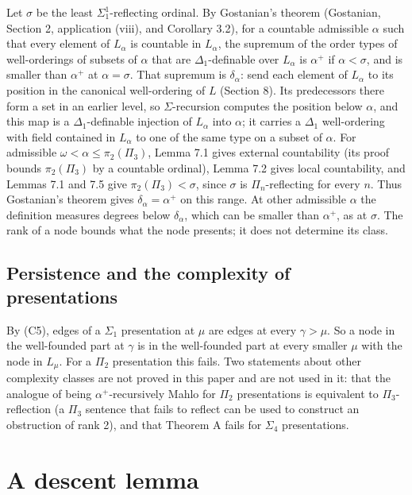 \documentclass[11pt]{article}
\begin{document}
Let $\sigma$ be the least $\Sigma^1_1$-reflecting ordinal. By Gostanian's theorem (Gostanian, Section 2, application
(viii), and Corollary 3.2), for a countable admissible $\alpha$ such that every element of $L_{\alpha}$ is countable in $L_{\alpha}$, the
supremum of the order types of well-orderings of subsets of $\alpha$ that are $\Delta_1$-definable over $L_{\alpha}$
is $\alpha^+$ if $\alpha < \sigma$, and is smaller than $\alpha^+$ at $\alpha = \sigma$. That supremum is
$\delta_{\alpha}$: send each element of $L_{\alpha}$ to its position in the canonical well-ordering of $L$ (Section
8). Its predecessors there form a set in an earlier level, so $\Sigma$-recursion computes the position below $\alpha$,
and this map is a $\Delta_1$-definable injection of $L_{\alpha}$ into $\alpha$; it carries a $\Delta_1$ well-ordering
with field contained in $L_{\alpha}$ to one of the same type on a subset of $\alpha$. For admissible
$\omega < \alpha \le \pi_2(\Pi_3)$, Lemma 7.1 gives external countability (its proof bounds $\pi_2(\Pi_3)$ by a countable
ordinal), Lemma 7.2 gives local countability, and
Lemmas 7.1 and 7.5 give $\pi_2(\Pi_3) < \sigma$, since $\sigma$ is $\Pi_n$-reflecting for every $n$. Thus Gostanian's
theorem gives $\delta_{\alpha} = \alpha^+$ on this range. At other admissible $\alpha$ the definition measures degrees
below $\delta_{\alpha}$, which can be smaller than $\alpha^+$, as at $\sigma$. The rank of a node bounds what the node
presents; it does not determine its class.

\subsection{Persistence and the complexity of presentations}

By (C5), edges of a $\Sigma_1$ presentation at $\mu$ are edges at every $\gamma > \mu$. So a node in the well-founded
part at $\gamma$ is in the well-founded part at every smaller $\mu$ with the node in $L_{\mu}$. For a $\Pi_2$ presentation this
fails. Two statements about other complexity classes are not proved in this paper and are not used in it: that the
analogue of being $\alpha^+$-recursively Mahlo for $\Pi_2$ presentations is equivalent to $\Pi_3$-reflection (a $\Pi_3$ sentence that fails to reflect can
be used to construct an obstruction of rank 2), and that Theorem A fails for $\Sigma_4$ presentations.

\section{A descent lemma}
\end{document}
